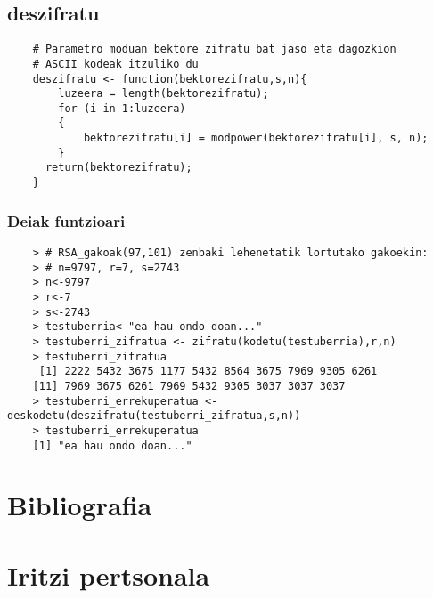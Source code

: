 \documentclass[12pt]{basque-book}
\begin{document}
\newpage

\section{deszifratu}
\begin{verbatim}
    # Parametro moduan bektore zifratu bat jaso eta dagozkion 
    # ASCII kodeak itzuliko du
    deszifratu <- function(bektorezifratu,s,n){
        luzeera = length(bektorezifratu);
        for (i in 1:luzeera)
        {
            bektorezifratu[i] = modpower(bektorezifratu[i], s, n);
        }
      return(bektorezifratu);
    }
\end{verbatim}

\subsection{Deiak funtzioari}
\begin{verbatim}
    > # RSA_gakoak(97,101) zenbaki lehenetatik lortutako gakoekin:
    > # n=9797, r=7, s=2743
    > n<-9797
    > r<-7
    > s<-2743
    > testuberria<-"ea hau ondo doan..."
    > testuberri_zifratua <- zifratu(kodetu(testuberria),r,n)
    > testuberri_zifratua
     [1] 2222 5432 3675 1177 5432 8564 3675 7969 9305 6261
    [11] 7969 3675 6261 7969 5432 9305 3037 3037 3037
    > testuberri_errekuperatua <- deskodetu(deszifratu(testuberri_zifratua,s,n))
    > testuberri_errekuperatua
    [1] "ea hau ondo doan..."
\end{verbatim}

\chapter{Bibliografia}



\chapter{Iritzi pertsonala}
\end{document}
